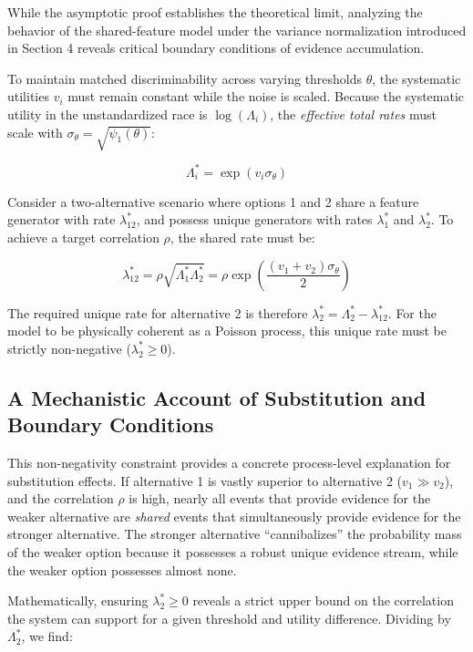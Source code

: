 \documentclass[
  man,
  floatsintext,
  longtable,
  a4paper,
  nolmodern,
  notxfonts,
  notimes,
  colorlinks=true,linkcolor=blue,citecolor=blue,urlcolor=blue]{apa7}
\begin{document}
While the asymptotic proof establishes the theoretical limit, analyzing
the behavior of the shared-feature model under the variance
normalization introduced in Section 4 reveals critical boundary
conditions of evidence accumulation.

To maintain matched discriminability across varying thresholds
\(\theta\), the systematic utilities \(v_i\) must remain constant while
the noise is scaled. Because the systematic utility in the
unstandardized race is \(\log(\Lambda_i)\), the \emph{effective total
rates} must scale with \(\sigma_\theta = \sqrt{\psi_1(\theta)}\):

\[\Lambda_i^* = \exp(v_i \sigma_\theta)\]

Consider a two-alternative scenario where options 1 and 2 share a
feature generator with rate \(\lambda_{12}^*\), and possess unique
generators with rates \(\lambda_1^*\) and \(\lambda_2^*\). To achieve a
target correlation \(\rho\), the shared rate must be:

\[\lambda_{12}^* = \rho \sqrt{\Lambda_1^* \Lambda_2^*} = \rho \exp\left(\frac{(v_1 + v_2) \sigma_\theta}{2}\right)\]

The required unique rate for alternative 2 is therefore
\(\lambda_2^* = \Lambda_2^* - \lambda_{12}^*\). For the model to be
physically coherent as a Poisson process, this unique rate must be
strictly non-negative (\(\lambda_2^* \ge 0\)).

\subsection{A Mechanistic Account of Substitution and Boundary
Conditions}\label{a-mechanistic-account-of-substitution-and-boundary-conditions}

This non-negativity constraint provides a concrete process-level
explanation for substitution effects. If alternative 1 is vastly
superior to alternative 2 (\(v_1 \gg v_2\)), and the correlation
\(\rho\) is high, nearly all events that provide evidence for the weaker
alternative are \emph{shared} events that simultaneously provide
evidence for the stronger alternative. The stronger alternative
``cannibalizes'' the probability mass of the weaker option because it
possesses a robust unique evidence stream, while the weaker option
possesses almost none.

Mathematically, ensuring \(\lambda_2^* \ge 0\) reveals a strict upper
bound on the correlation the system can support for a given threshold
and utility difference. Dividing by \(\Lambda_2^*\), we find:
\end{document}
